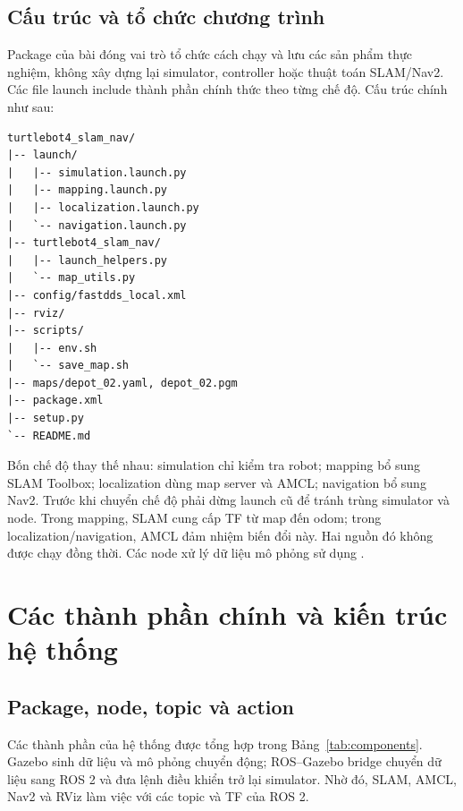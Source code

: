 \documentclass[12pt,a4paper]{article}
\newcommand{\code}[1]{\texttt{\detokenize{#1}}}
\begin{document}
\subsection{Cấu trúc và tổ chức chương trình}
Package của bài đóng vai trò tổ chức cách chạy và lưu các sản phẩm thực nghiệm,
không xây dựng lại simulator, controller hoặc thuật toán SLAM/Nav2. Các file
launch include thành phần chính thức theo từng chế độ. Cấu trúc chính như sau:
\begin{lstlisting}
turtlebot4_slam_nav/
|-- launch/
|   |-- simulation.launch.py
|   |-- mapping.launch.py
|   |-- localization.launch.py
|   `-- navigation.launch.py
|-- turtlebot4_slam_nav/
|   |-- launch_helpers.py
|   `-- map_utils.py
|-- config/fastdds_local.xml
|-- rviz/
|-- scripts/
|   |-- env.sh
|   `-- save_map.sh
|-- maps/depot_02.yaml, depot_02.pgm
|-- package.xml
|-- setup.py
`-- README.md
\end{lstlisting}

Bốn chế độ thay thế nhau: simulation chỉ kiểm tra robot; mapping bổ sung
SLAM Toolbox; localization dùng map server và AMCL; navigation bổ sung Nav2.
Trước khi chuyển chế độ phải dừng launch cũ để tránh trùng simulator và node.
Trong mapping, SLAM cung cấp TF từ map đến odom; trong localization/navigation,
AMCL đảm nhiệm biến đổi này. Hai nguồn đó không được chạy đồng thời.
Các node xử lý dữ liệu mô phỏng sử dụng \code{use_sim_time=true}.

\FloatBarrier
\section{Các thành phần chính và kiến trúc hệ thống}
\subsection{Package, node, topic và action}
Các thành phần của hệ thống được tổng hợp trong Bảng~\ref{tab:components}.
Gazebo sinh dữ liệu và mô phỏng chuyển động; ROS--Gazebo bridge chuyển dữ liệu
sang ROS 2 và đưa lệnh điều khiển trở lại simulator. Nhờ đó, SLAM, AMCL, Nav2
và RViz làm việc với các topic và TF của ROS 2.
\end{document}

